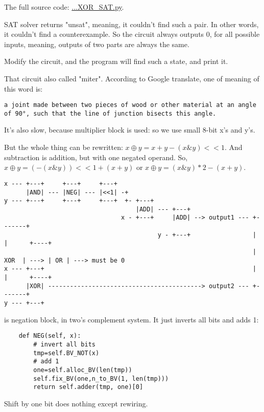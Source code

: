 The full source code: \url{...XOR_SAT.py}.

SAT solver returns "unsat", meaning, it couldn't find such a pair.
In other words, it couldn't find a counterexample.
So the circuit always outputs 0, for all possible inputs, meaning, outputs of two parts are always the same.

Modify the circuit, and the program will find such a state, and print it.

That circuit also called "miter".
According to Google translate, one of meaning of this word is:

\begin{lstlisting}
a joint made between two pieces of wood or other material at an angle of 90°, such that the line of junction bisects this angle.
\end{lstlisting}

It's also slow, because multiplier block is used: so we use small 8-bit x's and y's.

But the whole thing can be rewritten: $x \oplus y = x+y - (x \& y)<<1$.
And subtraction is addition, but with one negated operand.
So, $x \oplus y = (-(x \& y))<<1 + (x + y)$ or
$x \oplus y = (x \& y)*2 - (x + y)$.

\begin{lstlisting}
x --- +---+     +---+     +---+
      |AND| --- |NEG| --- |<<1| -+ 
y --- +---+     +---+     +---+  +- +---+
                                    |ADD| --- +---+
                                x - +---+     |ADD| --> output1 --- +-------+
                                          y - +---+                 |       |      +----+
                                                                    |  XOR  | ---> | OR | ---> must be 0
x --- +---+                                                         |       |      +----+
      |XOR| ------------------------------------------> output2 --- +-------+
y --- +---+
\end{lstlisting}

 is negation block, in two's complement system.
It just inverts all bits and adds 1:

\begin{lstlisting}
    def NEG(self, x):
        # invert all bits
        tmp=self.BV_NOT(x)
        # add 1
        one=self.alloc_BV(len(tmp))
        self.fix_BV(one,n_to_BV(1, len(tmp)))
        return self.adder(tmp, one)[0]
\end{lstlisting}

Shift by one bit does nothing except rewiring.

